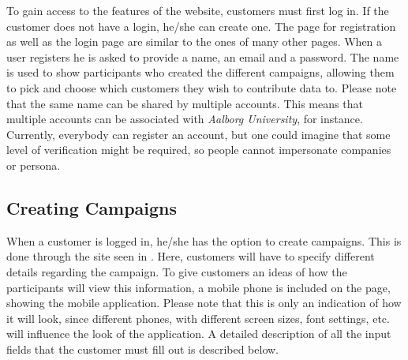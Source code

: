 To gain access to the features of the website, customers must first log in. If the customer does not have a login, he/she can create one. The page for registration as well as the login page are similar to the ones of many other pages. When a user registers he is asked to provide a name, an email and a password. The name is used to show participants who created the different campaigns, allowing them to pick and choose which customers they wish to contribute data to. Please note that the same name can be shared by multiple accounts. This means that multiple accounts can be associated with \emph{Aalborg University}, for instance. Currently, everybody can register an account, but one could imagine that some level of verification might be required, so people cannot impersonate companies or persona. 




\subsection{Creating Campaigns}
\label{sub:creating_campaign}

When a customer is logged in, he/she has the option to create campaigns. This is done through the site seen in . Here, customers will have to specify different details regarding the campaign. To give customers an ideas of how the participants will view this information, a mobile phone is included on the page, showing the mobile application. Please note that this is only an indication of how it will look, since different phones, with different screen sizes, font settings, etc. will influence the look of the application. A detailed description of all the input fields that the customer must fill out is described below.

